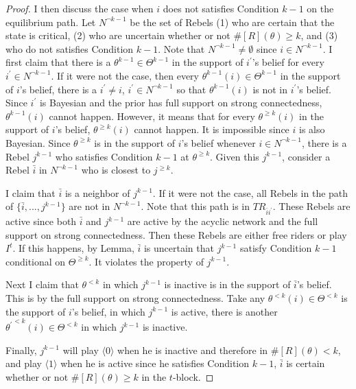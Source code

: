 \documentclass[12pt,letter]{article}
\theoremstyle{definition}
\theoremstyle{definition}
\theoremstyle{remark}
\theoremstyle{claim}
\begin{document}
\begin{proof}
I then discuss the case when $i$ does not satisfies Condition $k-1$ on the equilibrium path. Let $N^{\neg k-1}$ be the set of Rebels (1) who are certain that the state is critical, (2) who are uncertain whether or not $\#[R](\theta)\geq k$, and (3) who do not satisfies Condition $k-1$. Note that $N^{\neg k-1}\neq \emptyset$ since $i\in N^{\neg k-1}$. I first claim that there is a $\theta^{k-1}\in\Theta^{k-1}$ in the support of $i^{'}$'s belief for every $i^{'}\in N^{\neg k-1}$. If it were not the case, then every $\theta^{k-1}(i)\in \Theta^{k-1}$ in the  support of $i$'s belief, there is a $i^{'}\neq i$, $i^{'}\in N^{\neg k-1}$ so that $\theta^{k-1}(i)$ is not in $i^{'}$'s belief. Since $i^{'}$ is Bayesian and the prior has full support on strong connectedness, $\theta^{k-1}(i)$ cannot happen. However, it means that for every $\theta^{\geq k}(i)$ in the support of $i$'s belief, $\theta^{\geq k}(i)$ cannot happen. It is impossible since $i$ is also Bayesian. Since $\theta^{\geq k}$ is in the support of $i$'s belief whenever $i\in N^{\neg k-1}$, there is a Rebel $j^{k-1}$ who satisfies Condition $k-1$ at $\theta^{\geq k}$. Given this $j^{k-1}$, consider a Rebel $\bar{i}$ in $N^{\neg k-1}$ who is closest to $j^{\geq k}$. 

I claim that $\bar{i}$ is a neighbor of $j^{k-1}$. If it were not the case, all Rebels in the path of $\{\bar{i},...,j^{k-1}\}$ are not in $N^{\neg k-1}$. Note that this path is in $TR_{\bar{i}i^{'}}$. These Rebels are active since both $\bar{i}$ and $j^{k-1}$ are active by the acyclic network and the full support on strong connectedness. Then these Rebels are either free riders or play $I^t$. If this happens, by Lemma, $\bar{i}$ is uncertain that $j^{k-1}$ satisfy Condition $k-1$ conditional on $\Theta^{\geq k}$. It violates the property of $j^{k-1}$.

Next I claim that $\theta^{<k}$ in which $j^{k-1}$ is inactive is in the support of $\bar{i}$'s belief. This is by the full support on strong connectedness. Take any $\theta^{<k}(i)\in \Theta^{<k}$ is the support of $i$'s belief, in which $j^{k-1}$ is active, there is another ${\theta^{'}}^{<k}(i)\in \Theta^{<k}$ in which $j^{k-1}$ is inactive.

Finally, $j^{k-1}$ will play $\langle 0 \rangle$ when he is inactive and therefore in $\#[R](\theta)<k$, and play $\langle 1 \rangle$ when he is active since he satisfies Condition $k-1$, $\bar{i}$ is certain whether or not $\#[R](\theta)\geq k$ in the $t$-block.











\end{proof}
\end{document}
